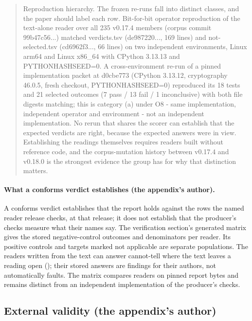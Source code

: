 \begin{quote}
Reproduction hierarchy. The frozen re-runs fall into distinct classes, and the paper should label each row. Bit-for-bit operator reproduction of the text-alone reader over all 235 v0.17.4 members (corpus commit 99b47c56...) matched verdicts.tsv (de987220..., 169 lines) and not-selected.tsv (cd6962f3..., 66 lines) on two independent environments, Linux arm64 and Linux x86\_64 with CPython 3.13.13 and PYTHONHASHSEED=0. A cross-environment re-run of a pinned implementation packet at d0cbe773 (CPython 3.13.12, cryptography 46.0.5, fresh checkout, PYTHONHASHSEED=0) reproduced its 18 tests and 21 selected outcomes (7 pass / 13 fail / 1 inconclusive) with both file digests matching; this is category (a) under O8 - same implementation, independent operator and environment - not an independent implementation. No rerun that shares the scorer can establish that the expected verdicts are right, because the expected answers were in view. Establishing the readings themselves requires readers built without reference code, and the corpus-mutation history between v0.17.4 and v0.18.0 is the strongest evidence the group has for why that distinction matters.
\end{quote}

\paragraph{What a conforms verdict establishes (the appendix's author).} A conforms verdict establishes that the report holds against the rows the named reader release checks, at that release; it does not establish that the producer's checks measure what their names say. The verification section's generated matrix gives the stored negative-control outcomes and denominators per reader. Its positive controls and targets marked not applicable are separate populations. The readers written from the text can answer cannot-tell where the text leaves a reading open (); their stored answers are findings for their authors, not automatically faults. The matrix compares readers on pinned report bytes and remains distinct from an independent implementation of the producer's checks.

\subsection{External validity (the appendix's author)}

